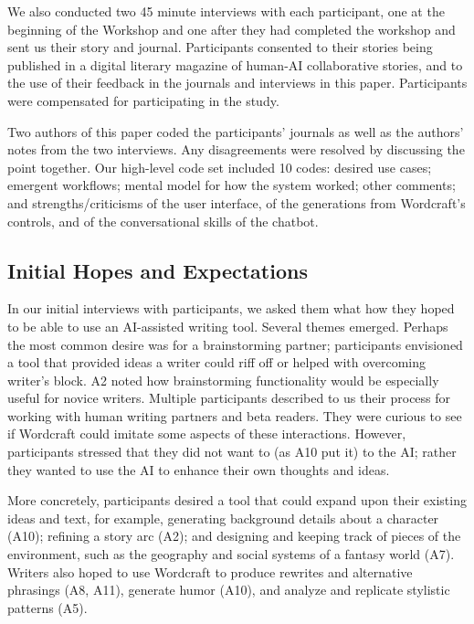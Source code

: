 We also conducted two 45 minute interviews with each participant, one at the beginning of the Workshop and one after they had completed the workshop and sent us their story and journal.
Participants consented to their stories being published in a digital literary magazine of human-AI collaborative stories, and to the use of their feedback in the journals and interviews in this paper.
Participants were compensated for participating in the study.

Two authors of this paper coded the participants' journals as well as the authors' notes from the two interviews.
Any disagreements were resolved by discussing the point together.
Our high-level code set included 10 codes: desired use cases; emergent workflows; mental model for how the system worked; other comments; and strengths/criticisms of the user interface, of the generations from Wordcraft's controls, and of the conversational skills of the chatbot.

\subsection{Initial Hopes and Expectations}
\label{sec:expectations}

In our initial interviews with participants, we asked them what how they hoped to be able to use an AI-assisted writing tool. Several themes emerged.
Perhaps the most common desire was for a brainstorming partner; participants envisioned a tool that provided ideas a writer could riff off or helped with overcoming writer's block.
A2 noted how brainstorming functionality would be especially useful for novice writers.
Multiple participants described to us their process for working with human writing partners and beta readers. 
They were curious to see if Wordcraft could imitate some aspects of these interactions.
However, participants stressed that they did not want to  (as A10 put it) to the AI; rather they wanted to use the AI to enhance their own thoughts and ideas.

More concretely, participants desired a tool that could expand upon their existing ideas and text, for example, generating background details about a character (A10);  refining a story arc (A2); and designing and keeping track of pieces of the environment, such as the geography and social systems of a fantasy world (A7).
Writers also hoped to use Wordcraft to produce rewrites and alternative phrasings (A8, A11), generate humor (A10), and analyze and replicate stylistic patterns (A5).

